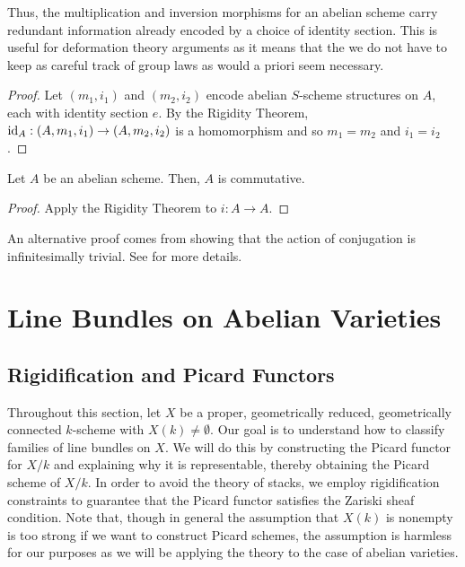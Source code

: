 \documentclass[11pt]{article}
\begin{document}
Thus, the multiplication and inversion morphisms for an abelian scheme carry redundant information already encoded by a choice of identity section. This is useful for deformation theory arguments as it means that the we do not have to keep as careful track of group laws as would a priori seem necessary.

\begin{proof}
Let $(m_1,i_1)$ and $(m_2,i_2)$ encode abelian $S$-scheme structures on $A$, each with identity section $e$. By the Rigidity Theorem, $\operatorname{id}_A: (A,m_1,i_1)\to(A,m_2,i_2)$ is a homomorphism and so $m_1=m_2$ and $i_1=i_2$.
\end{proof}

\begin{corollary}\label{abelian_schemes_commutative}
Let $A$ be an abelian scheme. Then, $A$ is commutative.
\end{corollary}

\begin{proof}
Apply the Rigidity Theorem to $i: A\to A$.
\end{proof}

\begin{remark}
An alternative proof comes from showing that the action of conjugation is infinitesimally trivial. See \cite[\textrm{Thm 1.5.1}]{Conrad} for more details.
\end{remark}

\section{Line Bundles on Abelian Varieties}
\subsection{Rigidification and Picard Functors}
Throughout this section, let $X$ be a proper, geometrically reduced, geometrically connected $k$-scheme with $X(k)\neq\emptyset$. Our goal is to understand how to classify families of line bundles on $X$. We will do this by constructing the Picard functor for $X/k$ and explaining why it is representable, thereby obtaining the Picard scheme of $X/k$. In order to avoid the theory of stacks, we employ rigidification constraints to guarantee that the Picard functor satisfies the Zariski sheaf condition. Note that, though in general the assumption that $X(k)$ is nonempty is too strong if we want to construct Picard schemes, the assumption is harmless for our purposes as we will be applying the theory to the case of abelian varieties.
\end{document}
